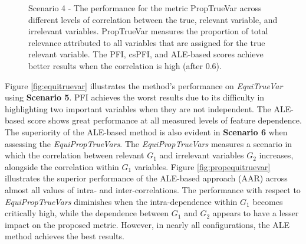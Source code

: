 \begin{figure}[ht!]
\centering
  \caption{Scenario 4 - The performance for the metric PropTrueVar across different levels of correlation between the true, relevant variable, and irrelevant variables. PropTrueVar measures the proportion of total relevance attributed to all variables that are assigned for the true relevant variable. The \gls{PFI}, \gls{csPFI}, and ALE-based scores achieve better results when the correlation is high (after 0.6).}
    \label{fig:propTrueVar}
\end{figure}

Figure \ref{fig:equitruevar} illustrates the method's performance on \textit{EquiTrueVar} using \textbf{Scenario 5}. \gls{PFI} achieves the worst results due to its difficulty in highlighting two important variables when they are not independent. The ALE-based score shows great performance at all measured levels of feature dependence. The superiority of the ALE-based method is also evident in \textbf{Scenario 6} when assessing the \textit{EquiPropTrueVars}. The \textit{EquiPropTrueVars} measures a scenario in which the correlation between relevant \(G_1\) and irrelevant variables \(G_2\) increases, alongside the correlation within \(G_1\) variables. Figure \ref{fig:propequitruevar} illustrates the superior performance of the ALE-based approach (\gls{AAR}) across almost all values of intra- and inter-correlations. The performance with respect to \textit{EquiPropTrueVars} diminishes when the intra-dependence within \(G_1\) becomes critically high, while the dependence between \(G_1\) and \(G_2\) appears to have a lesser impact on the proposed metric. However, in nearly all configurations, the ALE method achieves the best results.

